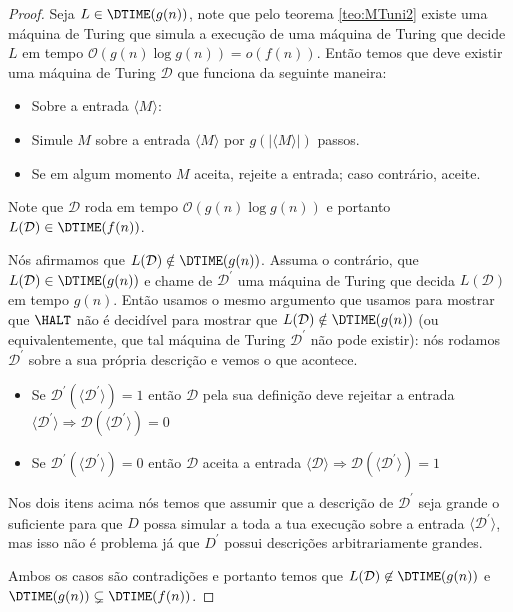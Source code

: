 \begin{proof}

Seja $L \in \DTIME(g(n))$, note que pelo teorema \ref{teo:MTuni2} existe uma máquina de Turing que simula a execução de uma máquina de Turing que decide $L$ em tempo $\mathcal{O}(g(n)\log g(n)) = o(f(n))$. Então temos que deve existir uma máquina de Turing $\mathcal{D}$ que funciona da seguinte maneira:

\begin{itemize}

\item Sobre a entrada $\langle M \rangle$:

\item Simule $M$ sobre a entrada $\langle M \rangle$ por $g(\lvert \langle M \rangle \rvert)$ passos.

\item Se em algum momento $M$ aceita, rejeite a entrada; caso contrário, aceite.

\end{itemize} 

Note que $\mathcal{D}$ roda em tempo $\mathcal{O}(g(n)\log g(n))$ e portanto $L(\mathcal{D}) \in \DTIME(f(n))$.

Nós afirmamos que $L(\mathcal{D}) \notin \DTIME(g(n))$. Assuma o contrário, que $L(\mathcal{D}) \in \DTIME(g(n))$ e chame de $\mathcal{D}^{\prime}$ uma máquina de Turing que decida $L(\mathcal{D})$ em tempo $g(n)$. Então usamos o mesmo argumento que usamos para mostrar que $\HALT$ não é decidível para mostrar que $L(\mathcal{D}) \notin \DTIME(g(n))$ (ou equivalentemente, que tal máquina de Turing $\mathcal{D}^{\prime}$ não pode existir): nós rodamos $\mathcal{D}^{\prime}$ sobre a sua própria descrição e vemos o que acontece.

\begin{itemize}

\item Se $\mathcal{D}^{\prime}(\langle \mathcal{D}^{\prime} \rangle) = 1$ então $\mathcal{D}$ pela sua definição deve rejeitar a entrada $\langle \mathcal{D}^{\prime} \rangle \Rightarrow \mathcal{D}(\langle \mathcal{D}^{\prime} \rangle) = 0$

\item Se $\mathcal{D}^{\prime}(\langle \mathcal{D}^{\prime} \rangle) = 0$ então $\mathcal{D}$ aceita a entrada $\langle \mathcal{D} \rangle \Rightarrow \mathcal{D}(\langle \mathcal{D}^{\prime} \rangle) = 1$

\end{itemize}

Nos dois itens acima nós temos que assumir que a descrição de $\mathcal{D}^{\prime}$ seja grande o suficiente para que $D$ possa simular a toda a tua execução sobre a entrada $\langle \mathcal{D}^{\prime} \rangle$, mas isso não é problema já que $D^{\prime}$ possui descrições arbitrariamente grandes.

Ambos os casos são contradições e portanto temos que $L(\mathcal{D}) \not\in \DTIME(g(n))$ e $\DTIME(g(n)) \subsetneq \DTIME(f(n))$.

\end{proof}

